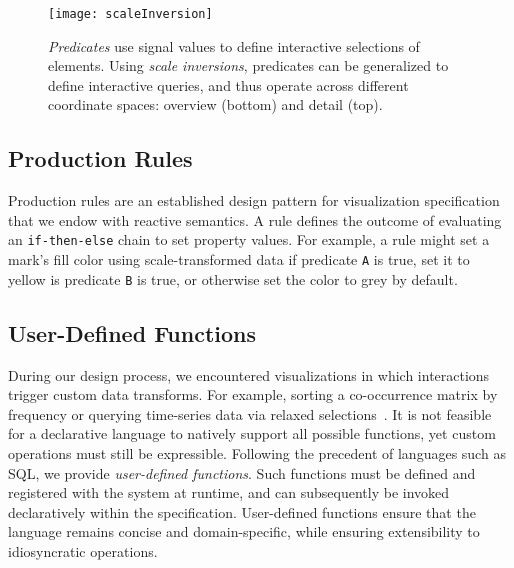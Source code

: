 \newpage
\begin{figure}[h!]
  \centering
  \texttt{[image: scaleInversion]}
  \caption{\emph{Predicates} use signal values to define interactive selections
of elements. Using \emph{scale inversions}, predicates can be generalized to
define interactive queries, and thus operate across different coordinate spaces:
overview (bottom) and detail (top).}
  \label{fig:vg:scaleInversion}
\end{figure}


\subsection{Production Rules}

\vspace{-10pt}

Production rules are an established design pattern for visualization
specification~\cite{heer:designpatterns} that we endow with reactive semantics.
A rule defines the outcome of evaluating an \texttt{if-then-else} chain to set
property values. For example, a rule might set a mark's fill color using
scale-transformed data if predicate \texttt{A} is true, set it to yellow is
predicate \texttt{B} is true, or otherwise set the color to grey by default.

\vspace{-10pt}

\subsection{User-Defined Functions}
\label{sec:udfs}

\vspace{-10pt}

During our design process, we encountered visualizations in which interactions
trigger custom data transforms. For example, sorting a co-occurrence matrix by
frequency or querying time-series data via relaxed
selections~\cite{holz:relaxed}. It is not feasible for a declarative language to
natively support all possible functions, yet custom operations must still be
expressible. Following the precedent of languages such as SQL, we provide
\emph{user-defined functions}. Such functions must be defined and registered
with the system at runtime, and can subsequently be invoked declaratively within
the specification. User-defined functions ensure that the language remains
concise and domain-specific, while ensuring extensibility to idiosyncratic
operations.

